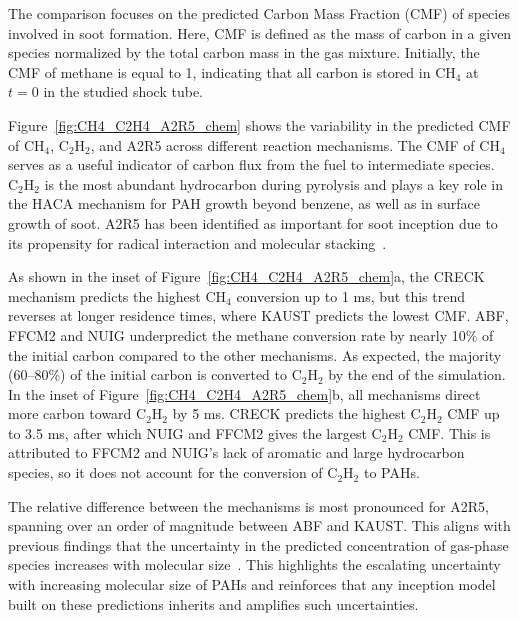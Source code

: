 The comparison focuses on the predicted Carbon Mass Fraction (CMF) of species involved in soot formation. Here, CMF is defined as the mass of carbon in a given species normalized by the total carbon mass in the gas mixture. Initially, the CMF of methane is equal to 1, indicating that all carbon is stored in $\mathrm{CH_4}$ at $t = 0$ in the studied shock tube. %


Figure~\ref{fig:CH4_C2H4_A2R5_chem} shows the variability in the predicted CMF of $\mathrm{CH_4}$, $\mathrm{C_2H_2}$, and A2R5 across different reaction mechanisms. The CMF of $\mathrm{CH_4}$ serves as a useful indicator of carbon flux from the fuel to intermediate species. $\mathrm{C_2H_2}$ is the most abundant hydrocarbon during pyrolysis and plays a key role in the HACA mechanism for PAH growth beyond benzene, as well as in surface growth of soot. A2R5 has been identified as important for soot inception due to its propensity for radical interaction and molecular stacking~\citep{martin2019reactivity}.

As shown in the inset of Figure~\ref{fig:CH4_C2H4_A2R5_chem}a, the CRECK mechanism predicts the highest $\mathrm{CH_4}$ conversion up to 1 ms, but this trend reverses at longer residence times, where KAUST predicts the lowest CMF. ABF, FFCM2 and NUIG underpredict the methane conversion rate by nearly 10\% of the initial carbon compared to the other mechanisms. As expected, the majority (60–80\%) of the initial carbon is converted to $\mathrm{C_2H_2}$ by the end of the simulation. In the inset of Figure~\ref{fig:CH4_C2H4_A2R5_chem}b, all mechanisms direct more carbon toward $\mathrm{C_2H_2}$ by 5 ms. CRECK predicts the highest $\mathrm{C_2H_2}$ CMF up to 3.5 ms, after which NUIG and FFCM2 gives the largest $\mathrm{C_2H_2}$ CMF. This is attributed to FFCM2 and NUIG’s lack of aromatic and large hydrocarbon species, so it does not account for the conversion of $\mathrm{C_2H_2}$ to PAHs.

The relative difference between the mechanisms is most pronounced for A2R5, spanning over an order of magnitude between ABF and KAUST. This aligns with previous findings that the uncertainty in the predicted concentration of gas-phase species increases with molecular size~\cite{wang2023systematic}. This highlights the escalating uncertainty with increasing molecular size of PAHs and reinforces that any inception model built on these predictions inherits and amplifies such uncertainties.
 
